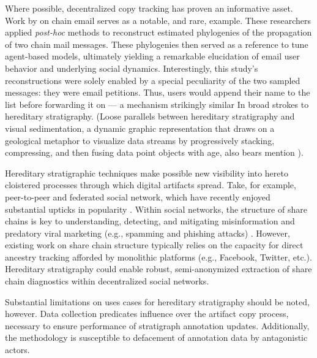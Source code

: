 Where possible, decentralized copy tracking has proven an informative asset.
Work by \cite{libennowell2008tracing} on chain email serves as a notable, and rare, example.
These researchers applied \textit{post-hoc} methods to reconstruct estimated phylogenies of the propagation of two chain mail messages.
These phylogenies then served as a reference to tune agent-based models, ultimately yielding a remarkable elucidation of email user behavior and underlying social dynamics.
Interestingly, this study's reconstructions were solely enabled by a special peculiarity of the two sampled messages: they were email petitions.
Thus, users would append their name to the list before forwarding it on --- a mechanism strikingly similar In broad strokes to hereditary stratigraphy.
(Loose parallels between hereditary stratigraphy and visual sedimentation, a dynamic graphic representation that draws on a geological metaphor to visualize data streams by progressively stacking, compressing, and then fusing data point objects with age, also bears mention \citep{huron2013visual}).

Hereditary stratigraphic techniques make possible new visibility into hereto cloistered processes through which digital artifacts spread.
Take, for example, peer-to-peer and federated social network, which have recently enjoyed substantial upticks in popularity \citep{la2021understanding}.
Within social networks, the structure of share chains is key to understanding, detecting, and mitigating misinformation \citep{kucharski2016study,raponi2022fake} and predatory viral marketing (e.g., spamming and phishing attacks) \citep{guidi2018managing}.
However, existing work on share chain structure typically relies on the capacity for direct ancestry tracking afforded by monolithic platforms (e.g., Facebook, Twitter, etc.).
Hereditary stratigraphy could enable robust, semi-anonymized extraction of share chain diagnostics within decentralized social networks.

Substantial limitations on uses cases for hereditary stratigraphy should be noted, however.
Data collection predicates influence over the artifact copy process, necessary to ensure performance of stratigraph annotation updates.
Additionally, the methodology is susceptible to defacement of annotation data by antagonistic actors.
